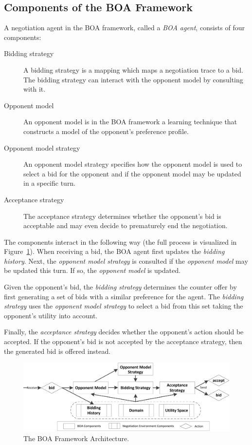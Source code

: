 \documentclass[]{article}
\begin{document}
\subsection{Components of the BOA Framework}
A negotiation agent in the BOA framework, called a \textit{BOA agent}, consists of four components:
\begin{description}
  \item[Bidding strategy] A bidding strategy is a mapping which maps a negotiation trace to a bid. The bidding strategy can interact with the opponent model by consulting with it.%

  \item[Opponent model] An opponent model is in the BOA framework a learning technique that constructs a model of the opponent's preference profile.%
  \item[Opponent model strategy] An opponent model strategy specifies how the opponent model is used to select a bid for the opponent and if the opponent model may be updated in a specific turn.
  \item[Acceptance strategy] The acceptance strategy determines whether the opponent's bid is acceptable and may even decide to prematurely end the negotiation.
\end{description}
The components interact in the following way (the full process is visualized in Figure~\ref{fig:flowchart}). When receiving a bid, the BOA agent first  updates the \textit{bidding history}. Next, the \textit{opponent model strategy} is consulted if the \textit{opponent model} may be updated this turn. If so, the \textit{opponent model} is updated.

Given the opponent's bid, the \textit{bidding strategy} determines the counter offer by first generating a set of bids with a similar preference for the agent. The \textit{bidding strategy} uses the \textit{opponent model strategy} to select a bid from this set taking the opponent's utility into account.

Finally, the \textit{acceptance strategy} decides whether the opponent's action should be accepted. If the opponent's bid is not accepted by the acceptance strategy, then the generated bid is offered instead.

\begin{figure}[t] 
	\center
	\includegraphics[width=15.0cm]{media/BOAflow.png}
	\caption{The BOA Framework Architecture.}
	\label{fig:flowchart}
\end{figure}
\pagebreak
\end{document}
